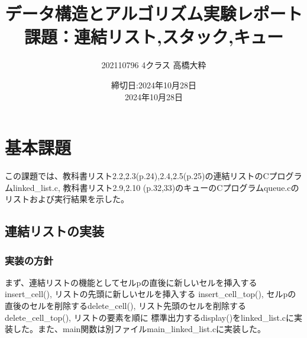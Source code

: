 \documentclass{ltjsarticle}
\begin{document}
\title{データ構造とアルゴリズム実験レポート\\
課題：連結リスト,スタック,キュー}
\author{202110796 4クラス 高橋大粋}
\date{締切日:2024年10月28日\\
2024年10月28日}
\maketitle

\section{基本課題}
この課題では、教科書リスト2.2,2.3(p.24),2.4,2.5(p.25)の連結リストのCプログラムlinked\_list.c, 教科書リスト2.9,2.10
(p.32,33)のキューのCプログラムqueue.cのリストおよび実行結果を示した。
\subsection{連結リストの実装}
\subsubsection{実装の方針}\label{subsubsec:実装の方針1}
まず、連結リストの機能としてセルpの直後に新しいセルを挿入するinsert\_cell(), リストの先頭に新しいセルを挿入する
insert\_cell\_top(), セルpの直後のセルを削除するdelete\_cell(), リスト先頭のセルを削除するdelete\_cell\_top(), リストの要素を順に
標準出力するdisplay()をlinked\_list.cに実装した。また、main関数は別ファイルmain\_linked\_list.cに実装した。
\end{document}
